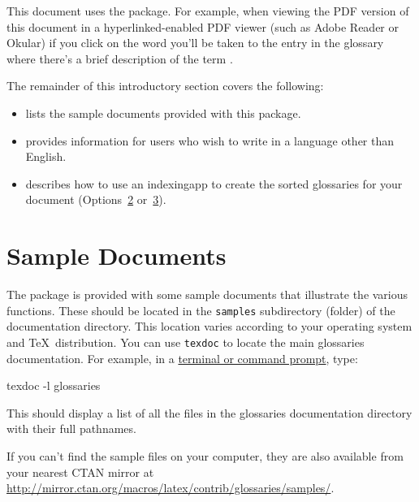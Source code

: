 \documentclass[report,inlinetitle,widecs]{nlctdoc}
\newcommand*{\optsor}[2]{Options~\hyperlink{option#1}{#1}
or~\hyperlink{option#2}{#2}}
\newcounter{sample}
\begin{document}
This document uses the  package. For example,
when viewing the PDF version of this document in a
hyperlinked-enabled PDF viewer (such as Adobe Reader or Okular) if
you click on the word  you'll be taken to the entry
in the glossary where there's a brief description of
the term .

The remainder of this introductory section covers the following:
\begin{itemize}
\item {} lists the sample documents provided 
with this package.

\item {} provides information for users who
wish to write in a language other than English.

\item {} describes how to use an
\gls{indexingapp} to create the sorted glossaries for your document
(\optsor23).

\end{itemize}

\section{Sample Documents}
\label{sec:samples}

The  package is provided with some sample
documents that illustrate the various functions. These should
be located in the \texttt{samples} subdirectory (folder) of the
 documentation directory. This location varies
according to your operating system and \TeX\ distribution. You
can use \texttt{texdoc} to locate the main glossaries documentation.
For example, in a
\href{http://www.dickimaw-books.com/latex/novices/html/terminal.html}{terminal or command prompt}, type:
\begin{prompt}
texdoc -l glossaries
\end{prompt}
This should display a list of all the files in the glossaries
documentation directory with their full pathnames.

If you can't find the sample files on your computer, they are also available
from your nearest CTAN mirror at
\url{http://mirror.ctan.org/macros/latex/contrib/glossaries/samples/}.
\end{document}
